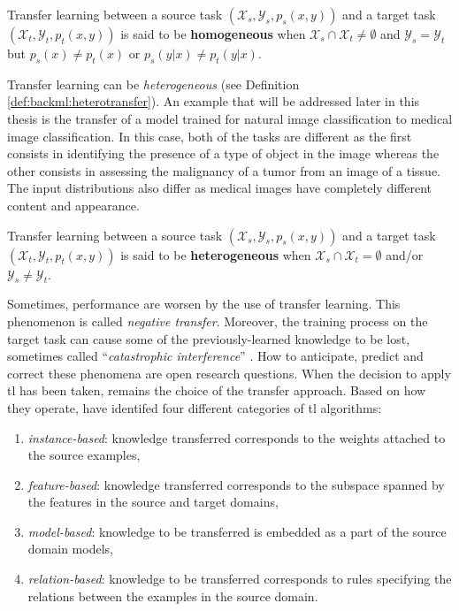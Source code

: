 \begin{definition}
\label{def:backml:homotransfer}
Transfer learning between a source task $\left(\mathcal{X}_{s}, \mathcal{Y}_{s}, p_{s}(x, y)\right)$ and a target task $\left(\mathcal{X}_t, \mathcal{Y}_t, p_t(x, y)\right)$ is said to be \textbf{homogeneous} when $\mathcal{X}_s \cap \mathcal{X}_t \neq \emptyset$ and $\mathcal{Y}_s = \mathcal{Y}_t$ but $p_s(x) \neq p_t(x)$ or $p_s(y|x) \neq p_t(y|x)$. 
\end{definition}

Transfer learning can be \textit{heterogeneous} (see Definition \ref{def:backml:heterotransfer}). An example that will be addressed later in this thesis is the transfer of a model trained for natural image classification to medical image classification. In this case, both of the tasks are different as the first consists in identifying the presence of a type of object in the image whereas the other consists in assessing the malignancy of a tumor from an image of a tissue. The input distributions also differ as medical images have completely different content and appearance.  

\begin{definition}
\label{def:backml:heterotransfer}
Transfer learning between a source task $\left(\mathcal{X}_{s}, \mathcal{Y}_{s}, p_{s}(x, y)\right)$ and a target task $\left(\mathcal{X}_t, \mathcal{Y}_t, p_t(x, y)\right)$ is said to be \textbf{heterogeneous} when $\mathcal{X}_s \cap \mathcal{X}_t = \emptyset$ and/or $\mathcal{Y}_s \neq \mathcal{Y}_t$.
\end{definition}

Sometimes, performance are worsen by the use of transfer learning. This phenomenon is called \textit{negative transfer}. Moreover, the training process on the target task can cause some of the previously-learned knowledge to be lost, sometimes called ``\textit{catastrophic interference}'' \cite{french1999catastrophic}. How to anticipate, predict and correct these phenomena are open research questions. When the decision to apply \acrlong{tl} has been taken, remains the choice of the transfer approach. Based on how they operate, \parencite{yang2020transfer} have identifed four different categories of \acrlong{tl} algorithms: 

\begin{enumerate}
  \item \textit{instance-based}: knowledge transferred corresponds to the weights attached to the source examples,
  \item \textit{feature-based}: knowledge transferred corresponds to the subspace spanned by the features in the source and target domains,
  \item \textit{model-based}: knowledge to be transferred is embedded as a part of the source domain models,
  \item \textit{relation-based}: knowledge to be transferred corresponds to rules specifying the relations between the examples in the source domain. 
\end{enumerate}

